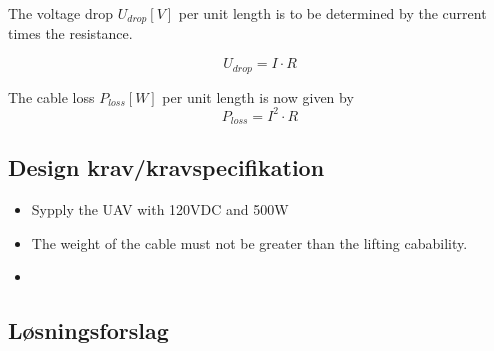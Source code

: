 The voltage drop $U_{drop}[V]$ per unit length is to be determined by  the current times the resistance.

\begin{equation}
U_{drop} = I \cdot R
\end{equation}

The cable loss $P_{loss}[W]$ per unit length is now given by
\begin{equation}
P_{loss} = I^2 \cdot R
\end{equation}





\subsection{Design krav/kravspecifikation}
\begin{itemize}
\item Sypply the UAV with 120VDC and 500W
\item The weight of the cable must not be greater than the lifting cabability.
\item 
\end{itemize}


\subsection{Løsningsforslag}



